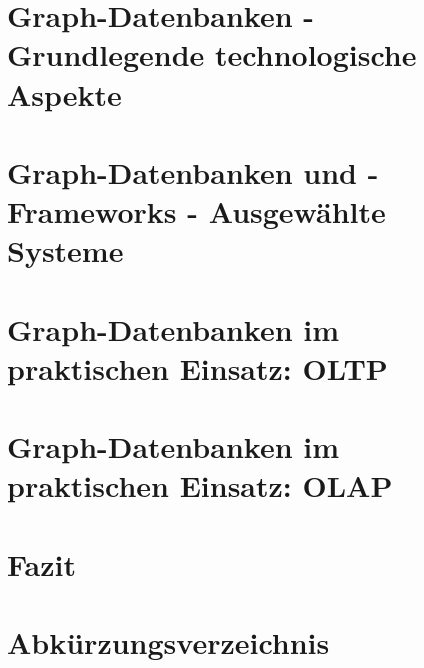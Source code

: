 \documentclass[12pt, bibliography=totoc, a4paper, abstractoff, numbers=noenddot]{scrreprt}
\begin{document}
%
\nocite{*} %


\setcounter{tocdepth}{2}
\newpage


%



%
\tableofcontents \newpage

%
%

%
%

%
%
%
%
\chapter{Graph-Datenbanken - Grundlegende technologische Aspekte}






\chapter{Graph-Datenbanken und -Frameworks - Ausgewählte Systeme }


\chapter{Graph-Datenbanken im praktischen Einsatz: \ac{OLTP}}










%
%
\chapter{Graph-Datenbanken im praktischen Einsatz: OLAP}




\chapter{Fazit}

 


%
\newpage
%
%
%

%
\newpage
{}
\listoffigures
\newpage
{}
\listoftables
\newpage
{}
\lstlistoflistings
%
{}
\renewcommand\refname{Abkürzungsverzeichnis}
\chapter*{Abkürzungsverzeichnis}
%
\newpage



%
\end{document}
